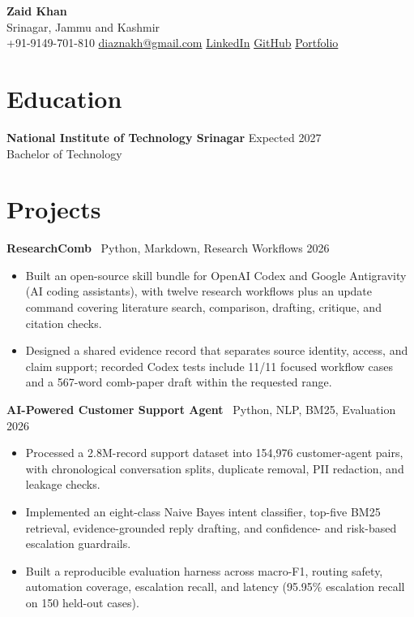 \documentclass[letterpaper,10pt]{article}
\begin{document}
\begin{center}
{\LARGE\bfseries Zaid Khan}\\[5pt]
Srinagar, Jammu and Kashmir\\[2pt]
+91-9149-701-810 \quad
\href{mailto:diaznakh@gmail.com}{diaznakh@gmail.com} \quad
\href{https://www.linkedin.com/in/zaid-khan-0873591ba/}{LinkedIn} \quad
\href{https://github.com/diaznakh}{GitHub} \quad
\href{https://diaznakh.github.io/}{Portfolio}
\end{center}

\section*{Education}
\textbf{National Institute of Technology Srinagar} \hfill Expected 2027\\
Bachelor of Technology

\section*{Projects}

\textbf{ResearchComb} \textbar\ Python, Markdown, Research Workflows \hfill 2026
\begin{itemize}
  \item Built an open-source skill bundle for OpenAI Codex and Google Antigravity (AI coding assistants), with twelve research workflows plus an update command covering literature search, comparison, drafting, critique, and citation checks.
  \item Designed a shared evidence record that separates source identity, access, and claim support; recorded Codex tests include 11/11 focused workflow cases and a 567-word comb-paper draft within the requested range.
\end{itemize}

\textbf{AI-Powered Customer Support Agent} \textbar\ Python, NLP, BM25, Evaluation \hfill 2026
\begin{itemize}
  \item Processed a 2.8M-record support dataset into 154,976 customer-agent pairs, with chronological conversation splits, duplicate removal, PII redaction, and leakage checks.
  \item Implemented an eight-class Naive Bayes intent classifier, top-five BM25 retrieval, evidence-grounded reply drafting, and confidence- and risk-based escalation guardrails.
  \item Built a reproducible evaluation harness across macro-F1, routing safety, automation coverage, escalation recall, and latency (95.95\% escalation recall on 150 held-out cases).
\end{itemize}
\end{document}
